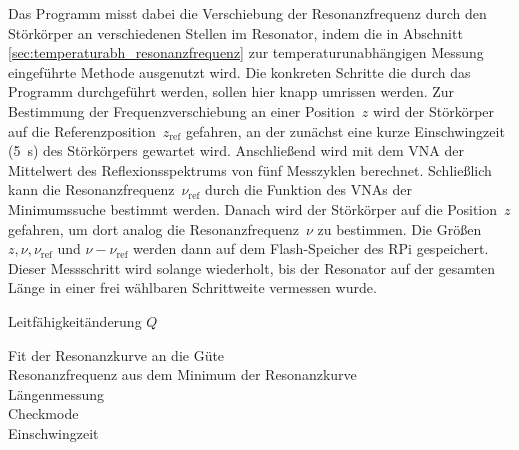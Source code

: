 Das Programm misst dabei die Verschiebung der Resonanzfrequenz durch den Störkörper an verschiedenen Stellen im Resonator, indem die in Abschnitt \ref{sec:temperaturabh_resonanzfrequenz} zur temperaturunabhängigen Messung eingeführte Methode ausgenutzt wird.
Die konkreten Schritte die durch das Programm durchgeführt werden, sollen hier knapp umrissen werden.
Zur Bestimmung der Frequenzverschiebung an einer Position~$z$ wird der Störkörper auf die Referenzposition~$z_\mathrm{ref}$ gefahren, an der zunächst eine kurze Einschwingzeit (\SI{5}{s}) des Störkörpers gewartet wird.
Anschließend wird mit dem VNA der Mittelwert des Reflexionsspektrums von fünf Messzyklen berechnet.
Schließlich kann die Resonanzfrequenz~$\nu_\mathrm{ref}$ durch die Funktion des VNAs der Minimumssuche bestimmt werden.
Danach wird der Störkörper auf die Position~$z$ gefahren, um dort analog die Resonanzfrequenz~$\nu$ zu bestimmen.
Die Größen $z, \nu, \nu_\mathrm{ref}$ und $\nu - \nu_\mathrm{ref}$ werden dann auf dem Flash-Speicher des RPi gespeichert.
Dieser Messschritt wird solange wiederholt, bis der Resonator auf der gesamten Länge in einer frei wählbaren Schrittweite vermessen wurde.


Leitfähigkeitänderung $Q$

Fit der Resonanzkurve an die Güte\\
Resonanzfrequenz aus dem Minimum der Resonanzkurve\\
Längenmessung\\
Checkmode\\
Einschwingzeit
